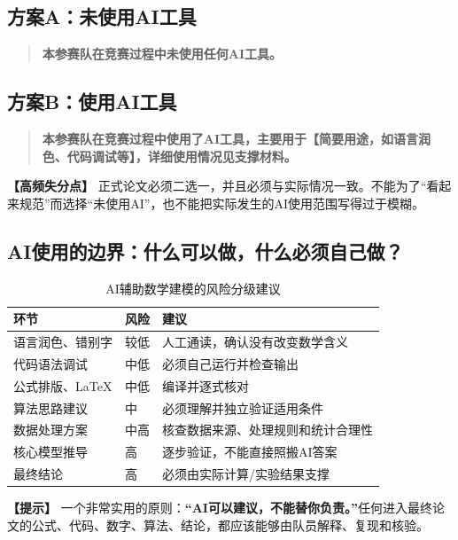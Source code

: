 \documentclass[12pt,a4paper]{article}
\newcommand{\tip}[1]{\par\noindent\textbf{【提示】} #1\par}
\newcommand{\warning}[1]{\par\noindent\textbf{【高频失分点】} #1\par}
\begin{document}
\subsection*{方案A：未使用AI工具}
\begin{quote}
\textbf{本参赛队在竞赛过程中未使用任何AI工具。}
\end{quote}

\subsection*{方案B：使用AI工具}
\begin{quote}
\textbf{本参赛队在竞赛过程中使用了AI工具，主要用于【简要用途，如语言润色、代码调试等】，详细使用情况见支撑材料。}
\end{quote}

\warning{正式论文必须二选一，并且必须与实际情况一致。不能为了“看起来规范”而选择“未使用AI”，也不能把实际发生的AI使用范围写得过于模糊。}

\subsection*{AI使用的边界：什么可以做，什么必须自己做？}

\begin{table}[H]
\centering
\caption{AI辅助数学建模的风险分级建议}
\begin{tabular}{p{3.5cm}p{1cm}p{7.5cm}}
\toprule
环节 & 风险 & 建议 \\
\midrule
语言润色、错别字 & 较低 & 人工通读，确认没有改变数学含义 \\
代码语法调试 & 中低 & 必须自己运行并检查输出 \\
公式排版、LaTeX & 中低 & 编译并逐式核对 \\
算法思路建议 & 中 & 必须理解并独立验证适用条件 \\
数据处理方案 & 中高 & 核查数据来源、处理规则和统计合理性 \\
核心模型推导 & 高 & 逐步验证，不能直接照搬AI答案 \\
最终结论 & 高 & 必须由实际计算/实验结果支撑 \\
\bottomrule
\end{tabular}
\end{table}

\tip{一个非常实用的原则：\textbf{“AI可以建议，不能替你负责。”}任何进入最终论文的公式、代码、数字、算法、结论，都应该能够由队员解释、复现和核验。}

\clearpage
\appendix
\end{document}
